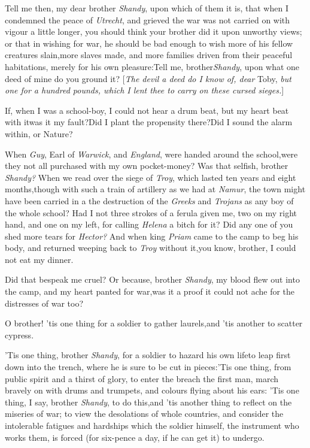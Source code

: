 \documentclass{article}
\begin{document}
Tell me then, my dear brother \textit{Shandy}, upon which of them
it is, that when I condemned the peace of \textit{Utrecht}, and
grieved the war was not carried on with vigour a little longer, you
should think your brother did it upon unworthy views; or that in
wishing for war, he should be bad enough to wish more of his
fellow creatures slain,\tsk more slaves made, and more families
driven from their peaceful habitations, merely for his own
pleasure:\tsh Tell me, brother\pb \textit{Shandy}, upon what
one deed of mine do you ground it? [\textit{The devil a deed do I know
of, dear} Toby, \textit{but one for a hundred pounds, which I lent
thee to carry on these cursed sieges.}]

If, when I was a school-boy, I could not hear a drum beat, but
my heart beat with it\tsk was it my fault?\tsh Did I
plant the propensity there?\tsh Did I sound the alarm
within, or Nature?

When \textit{Guy}, Earl of \textit{Warwick}, and 
 \textit{England}, were handed around the
school,\break\tsk were they not all purchased with my own pocket-money?
Was that selfish, brother \textit{Shandy?} When we read over the
siege of \textit{Troy}, which lasted ten years and eight
months,\tsh though with such a train of artillery as we
had at \textit{Namur}, the town might have been carried in a\pb
{} the
destruction of the \textit{Greeks} and \textit{Trojans} as any boy of
the whole school? Had I not three strokes of a ferula given me, two
on my right hand, and one on my left, for calling \textit{Helena} a
bitch for it? Did any one of you shed more tears for \textit{Hector?}
And when king \textit{Priam} came to the camp to beg his body, and
returned weeping back to \textit{Troy} without it,\tsk you know,
brother, I could not eat my dinner.\tsh

\tsh Did that bespeak me cruel? Or because, brother
\textit{Shandy}, my blood flew out into the camp, and my heart panted
for war,\tsk was it a proof it could not ache for the distresses
of war too?

O brother! ’tis one thing for a soldier to gather
laurels,\tsk and ’tis another to scatter
cypress.

\tsh ’Tis one thing, brother \textit{Shandy},\break
for a soldier to hazard his own life\tsk to leap first down into the trench, where
he is sure to be cut in pieces:\tsh ’Tis one thing, from public spirit and a thirst
of glory, to enter the breach the first man,\break{}
march bravely on with drums and trumpets, and colours flying about his ears:\break
\tsh ’Tis one thing, I say, brother \textit{Shandy}, to do this,\tsk and ’tis another
thing to reflect on the miseries of war;\break
\tsk to view the desolations of whole
countries, and consider the intolerable fatigues and hardships which the soldier
himself, the instrument who works them, is forced (for six-pence a day, if he can get
it) to undergo.
\end{document}
